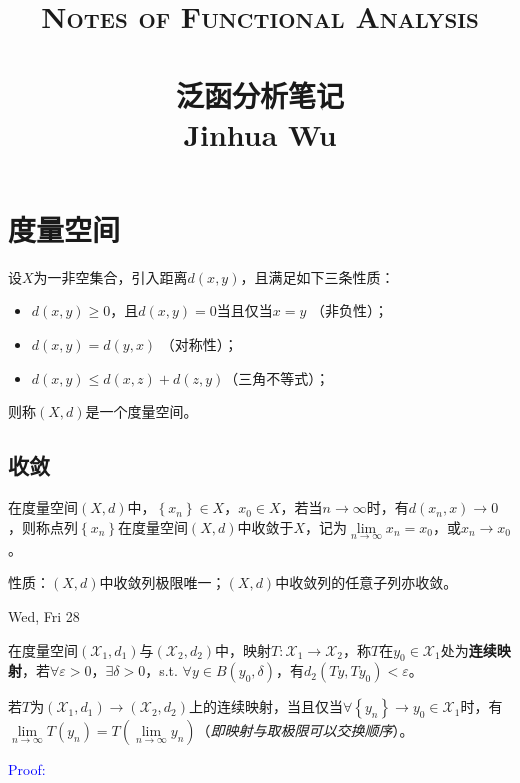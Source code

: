 
\usepackage{float}
\title{ \normalsize \textsc{Notes of Functional Analysis}
		\\ [2.0cm]
		\HRule{1.5pt} \\
		\LARGE \textbf{\uppercase{泛函分析笔记}
		\HRule{2.0pt} \\ [0.6cm] \LARGE{Jinhua Wu} \vspace*{10\baselineskip}}
		}
\date{}
\author{}

\maketitle
\tableofcontents 
\newpage
\setcounter{page}{1}
\chapter{度量空间}
\begin{definition}
    设$X$为一非空集合，引入距离$d(x, y)$，且满足如下三条性质：
    \begin{itemize}
            \item $d(x, y)\ge 0$，且$d(x, y)=0$当且仅当$x=y$ （非负性）；
            \item $d(x, y) = d(y, x)$ （对称性）；
            \item $d(x, y)\le d(x, z) + d(z, y)$（三角不等式）；
    \end{itemize}
    则称$(X, d)$是一个度量空间。
\end{definition}

\section{收敛}
\begin{definition}
    在度量空间$(X, d)$中，$\left\lbrace x_n \right\rbrace\in X$，$x_0\in X$，若当$n\to\infty$时，有$d(x_n, x)\to 0$，则称点列$\left\lbrace x_n \right\rbrace$在度量空间$(X, d)$中收敛于$X$，记为$\lim\limits_{n\to\infty} x_n = x_0$，或$x_n\to x_0$。
\end{definition}

性质：$(X, d)$中收敛列极限唯一；$(X, d)$中收敛列的任意子列亦收敛。

\newpage
\begin{center}
    Wed, Fri 28
\end{center}
\begin{definition}
    在度量空间$(\mathscr{X}_1, d_1)$与$(\mathscr{X}_2, d_2)$中，映射$T: \mathscr{X}_1\longrightarrow \mathscr{X}_2$，称$T$在$y_0\in\mathscr{X}_1$处为\textbf{连续映射}，若$\forall \varepsilon >0$，$\exists \delta>0$，s.t. $\forall y\in B(y_0, \delta)$，有$d_2(Ty, Ty_0)<\varepsilon$。
\end{definition}
\begin{corollary}
    若$T$为$(\mathscr{X}_1, d_1)\longrightarrow(\mathscr{X}_2, d_2)$上的连续映射，当且仅当$\forall \left\lbrace y_n \right\rbrace \rightarrow y_0\in\mathscr{X}_1$时，有$\lim\limits_{n\to\infty} T(y_n) = T(\lim\limits_{n\to\infty} y_n)$（\textit{即映射与取极限可以交换顺序}）。
\end{corollary}
\noindent \textcolor{blue}{Proof: }

